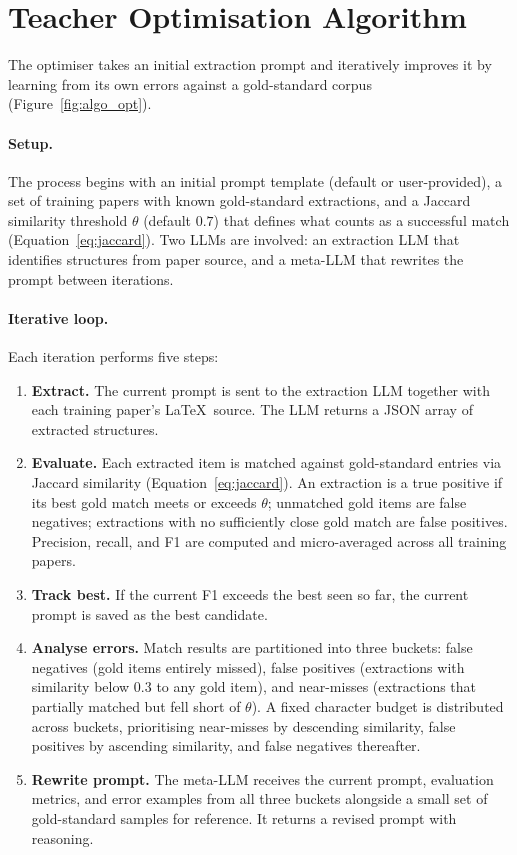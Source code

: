 \documentclass[11pt]{article}
\begin{document}
\section{Teacher Optimisation Algorithm}
\label{app:optimizer}

The optimiser takes an initial extraction prompt and iteratively improves it by learning from
its own errors against a gold-standard corpus (Figure~\ref{fig:algo_opt}).

\paragraph{Setup.}
The process begins with an initial prompt template (default or user-provided), a set of
training papers with known gold-standard extractions, and a Jaccard similarity threshold
$\theta$ (default $0.7$) that defines what counts as a successful match
(Equation~\ref{eq:jaccard}). Two LLMs are involved: an extraction LLM that identifies
structures from paper source, and a meta-LLM that rewrites the prompt between iterations.

\paragraph{Iterative loop.}
Each iteration performs five steps:

\begin{enumerate}
  \item \textbf{Extract.} The current prompt is sent to the extraction LLM together with each
    training paper's \LaTeX\ source. The LLM returns a JSON array of extracted structures.

  \item \textbf{Evaluate.} Each extracted item is matched against gold-standard entries via
    Jaccard similarity (Equation~\ref{eq:jaccard}). An extraction is a true positive if its
    best gold match meets or exceeds $\theta$; unmatched gold items are false negatives;
    extractions with no sufficiently close gold match are false positives. Precision, recall,
    and F1 are computed and micro-averaged across all training papers.

  \item \textbf{Track best.} If the current F1 exceeds the best seen so far, the current
    prompt is saved as the best candidate.

  \item \textbf{Analyse errors.} Match results are partitioned into three buckets: false
    negatives (gold items entirely missed), false positives (extractions with similarity below
    $0.3$ to any gold item), and near-misses (extractions that partially matched but fell
    short of $\theta$). A fixed character budget is distributed across buckets, prioritising
    near-misses by descending similarity, false positives by ascending similarity, and false
    negatives thereafter.

  \item \textbf{Rewrite prompt.} The meta-LLM receives the current prompt, evaluation
    metrics, and error examples from all three buckets alongside a small set of gold-standard
    samples for reference. It returns a revised prompt with reasoning.
\end{enumerate}
\end{document}

